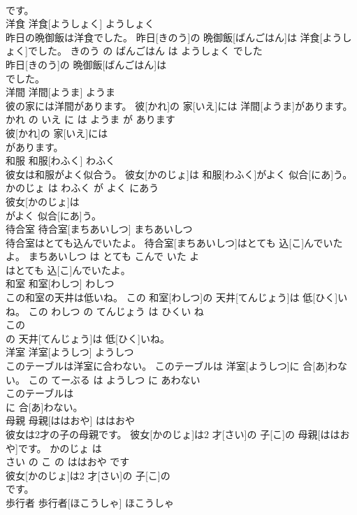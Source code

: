 \documentclass[8pt]{extreport}
\begin{document}
\begin{CJK}{UTF8}{min}
\\	です。			
\\	洋食	洋食[ようしょく]	ようしょく	
\\	昨日の晩御飯は洋食でした。	昨日[きのう]の 晩御飯[ばんごはん]は 洋食[ようしょく]でした。	きのう の ばんごはん は ようしょく でした	
\\	昨日[きのう]の 晩御飯[ばんごはん]は
\\	でした。			
\\	洋間	洋間[ようま]	ようま	
\\	彼の家には洋間があります。	彼[かれ]の 家[いえ]には 洋間[ようま]があります。	かれ の いえ に は ようま が あります	
\\	彼[かれ]の 家[いえ]には
\\	があります。			
\\	和服	和服[わふく]	わふく	
\\	彼女は和服がよく似合う。	彼女[かのじょ]は 和服[わふく]がよく 似合[にあ]う。	かのじょ は わふく が よく にあう	
\\	彼女[かのじょ]は
\\	がよく 似合[にあ]う。			
\\	待合室	待合室[まちあいしつ]	まちあいしつ	
\\	待合室はとても込んでいたよ。	待合室[まちあいしつ]はとても 込[こ]んでいたよ。	まちあいしつ は とても こんで いた よ	
\\	はとても 込[こ]んでいたよ。			
\\	和室	和室[わしつ]	わしつ	
\\	この和室の天井は低いね。	この 和室[わしつ]の 天井[てんじょう]は 低[ひく]いね。	この わしつ の てんじょう は ひくい ね	
\\	この
\\	の 天井[てんじょう]は 低[ひく]いね。			
\\	洋室	洋室[ようしつ]	ようしつ	
\\	このテーブルは洋室に合わない。	このテーブルは 洋室[ようしつ]に 合[あ]わない。	この てーぶる は ようしつ に あわない	
\\	このテーブルは
\\	に 合[あ]わない。			
\\	母親	母親[ははおや]	ははおや	
\\	彼女は2才の子の母親です。	彼女[かのじょ]は2 才[さい]の 子[こ]の 母親[ははおや]です。	かのじょ は 
\\	さい の こ の ははおや です	
\\	彼女[かのじょ]は2 才[さい]の 子[こ]の
\\	です。			
\\	歩行者	歩行者[ほこうしゃ]	ほこうしゃ	

\end{CJK}
\end{document}
